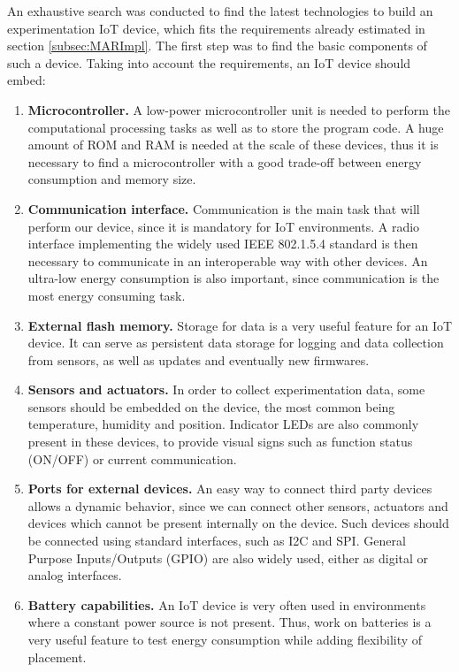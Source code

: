 An exhaustive search was conducted to find the latest technologies to build an experimentation IoT device, which fits the requirements already estimated in section \ref{subsec:MARImpl}.
The first step was to find the basic components of such a device.
Taking into account the requirements, an IoT device should embed:
\begin{enumerate}
	\item \textbf{Microcontroller.} A low-power microcontroller unit is needed to perform the computational processing tasks as well as to store the program code. 
	A huge amount of ROM and RAM is needed at the scale of these devices, thus it is necessary to find a microcontroller with a good trade-off between energy consumption and memory size.
	\item \textbf{Communication interface.} Communication is the main task that will perform our device, since it is mandatory for IoT environments.
	A radio interface implementing the widely used IEEE 802.1.5.4 standard\cite{ieee802.15.4} is then necessary to communicate in an interoperable way with other devices.
	An ultra-low energy consumption is also important, since communication is the most energy consuming task.
	\item \textbf{External flash memory.} Storage for data is a very useful feature for an IoT device. It can serve as persistent data storage for logging and data collection from sensors, as well as updates and eventually new firmwares.
	\item \textbf{Sensors and actuators.} In order to collect experimentation data, some sensors should be embedded on the device, the most common being temperature, humidity and position.
	Indicator LEDs are also commonly present in these devices, to provide visual signs such as function status (ON/OFF) or current communication.
	\item \textbf{Ports for external devices.} An easy way to connect third party devices allows a dynamic behavior, since we can connect other sensors, actuators and devices which cannot be present internally on the device.
	Such devices should be connected using standard interfaces, such as I2C and SPI.
	General Purpose Inputs/Outputs (GPIO) are also widely used, either as digital or analog interfaces.
	\item \textbf{Battery capabilities.} An IoT device is very often used in environments where a constant power source is not present.
	Thus, work on batteries is a very useful feature to test energy consumption while adding flexibility of placement.
\end{enumerate}

